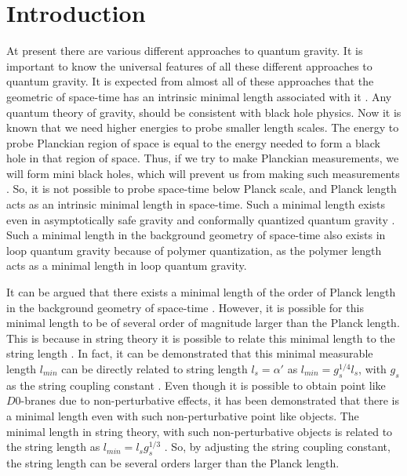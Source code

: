 \documentclass[12pt]{article}
\begin{document}
\section{Introduction}
At present  there are various different   approaches to quantum gravity.
It is important to know the universal features of all these different approaches to quantum gravity. It is expected from almost all of these approaches that the  geometric  of space-time has an intrinsic minimal length associated with it  \cite{s16}. Any quantum theory of gravity, should be consistent with black hole physics. Now it is known that we need higher energies to probe smaller length scales. The energy  to probe Planckian region of space is equal to  the energy needed to form a black hole in that region of space. Thus, if we try to make Planckian measurements, we will form mini black holes, which will prevent us from making such  measurements   \cite{z4,z5}. So, it is not possible to probe space-time below Planck scale, and Planck length acts as an intrinsic minimal length in space-time.  
Such a minimal length exists even in asymptotically safe gravity \cite{asgr} and conformally quantized quantum gravity \cite{cqqg}. Such a minimal length in the background geometry of space-time also exists in loop quantum gravity \cite{z1, po12, po14, 12p} because of polymer quantization, as the polymer length acts as a minimal length in loop quantum gravity.  


It can be argued that there exists a minimal length of the order of Planck length in the background geometry of space-time \cite{s16}. However, it is possible for this minimal length to be of several order of magnitude larger than the Planck length. This is because in string theory it is possible to relate this minimal length to the string length \cite{z2,zasaqsw}. In fact, it can be  demonstrated that  this  minimal measurable length $l_{min}$ can be directly related to string length $l_s = \alpha'$ as $l_{min} = g_s^{1/4} l_s$, with $g_s$ as the string coupling constant \cite{cscds,2z}. Even though it is possible to obtain point like $D0$-branes due to  non-perturbative effects, it has been demonstrated that there is a minimal length even  with such  non-perturbative point like objects. The minimal length in string theory, with such  non-perturbative objects is related to the string length as $l_{min} = l_s g_s^{1/3}$ \cite{s16, s18}. So, by adjusting the string coupling constant, the string length can be several orders larger than the Planck length. 
\end{document}
